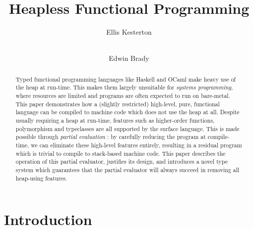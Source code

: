 \documentclass[runningheads]{llncs}
\begin{document}
%
\title{Heapless Functional Programming}
%
%
\author{Ellis Kesterton  \and \\
Edwin Brady }
%
%

\newcommand{\core}{$\mathcal{C}$}
\newcommand{\high}{$\mathcal{H}$}
\newcommand{\fom}{System $F_{\omega}$}
%
\maketitle              %
%
\begin{abstract}
Typed functional programming languages like Haskell and OCaml make heavy use of the heap at run-time. This makes them largely unsuitable for \emph{systems programming}, where resources are limited and programs are often expected to run on bare-metal. This paper demonstrates how a (slightly restricted) high-level, pure, functional language can be compiled to machine code which does not use the heap at all. Despite usually requiring a heap at run-time, features such as higher-order functions, polymorphism and typeclasses are all supported by the surface language. This is made possible through \emph{partial evaluation} \cite{jones1993partial}: by carefully reducing the program at compile-time, we can eliminate these high-level features entirely, resulting in a residual program which is trivial to compile to stack-based machine code. This paper describes the operation of this partial evaluator, justifies its design, and introduces a novel type system which guarantees that the partial evaluator will always succeed in removing all heap-using features.

\end{abstract}
%
%
%
\section{Introduction}
\end{document}
